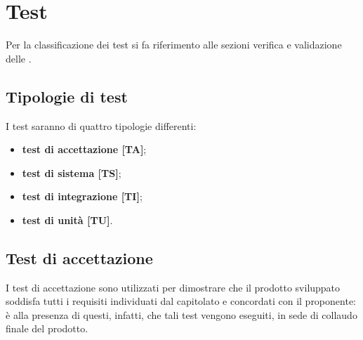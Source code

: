 \section{Test}
	Per la classificazione dei test si fa riferimento alle sezioni verifica e validazione delle .


	\subsection{Tipologie di test}
		I test saranno di quattro tipologie differenti:
		\begin{itemize}

			\item \textbf{test di accettazione [TA]};
			\item \textbf{test di sistema [TS]};
			\item \textbf{test di integrazione [TI]};
			\item \textbf{test di unità [TU]}.

		\end{itemize}

	\subsection{Test di accettazione}

		I test di accettazione sono utilizzati per dimostrare che il prodotto sviluppato soddisfa tutti i requisiti individuati dal capitolato e concordati con il proponente: è alla presenza di questi, infatti, che tali test vengono eseguiti, in sede di collaudo finale del prodotto.

